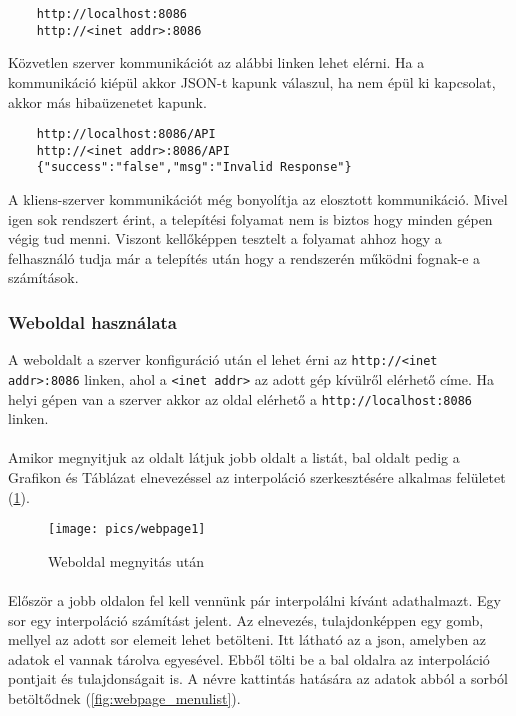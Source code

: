 	\begin{verbatim}
	http://localhost:8086
	http://<inet addr>:8086
	\end{verbatim}
	Közvetlen szerver kommunikációt az alábbi linken lehet elérni. 
	Ha a kommunikáció kiépül akkor JSON-t kapunk válaszul, ha nem épül ki kapcsolat, akkor más hibaüzenetet kapunk. 
	\begin{verbatim}
	http://localhost:8086/API
	http://<inet addr>:8086/API 
	{"success":"false","msg":"Invalid Response"}
	\end{verbatim}
	A kliens-szerver kommunikációt még bonyolítja az elosztott kommunikáció.
	Mivel igen sok rendszert érint, a telepítési folyamat nem is biztos hogy minden gépen végig tud menni. \newline
	Viszont kellőképpen tesztelt a folyamat ahhoz hogy a felhasználó tudja már a telepítés után hogy a rendszerén működni fognak-e a számítások.
\subsubsection{Weboldal használata}
	A weboldalt a szerver konfiguráció után el lehet érni az \texttt{http://<inet addr>:8086} linken, ahol a \texttt{<inet addr>} az adott gép kívülről elérhető címe. Ha helyi gépen van a szerver akkor az oldal elérhető a \texttt{http://localhost:8086} linken.

	\paragraph{}
	Amikor megnyitjuk az oldalt látjuk jobb oldalt a listát, bal oldalt pedig a Grafikon és Táblázat elnevezéssel az interpoláció szerkesztésére alkalmas felületet (\ref{fig:webpage1}).

	\begin{figure}[h]
		\texttt{[image: pics/webpage1]}
		\centering
		\caption{Weboldal megnyitás után\label{fig:webpage1}}
	\end{figure}

	\paragraph{}
	Először a jobb oldalon fel kell vennünk pár interpolálni kívánt adathalmazt. Egy sor egy interpoláció számítást jelent. Az elnevezés, tulajdonképpen egy gomb, mellyel az adott sor elemeit lehet betölteni.\newline
	Itt látható az a json, amelyben az adatok el vannak tárolva egyesével. Ebből tölti be a bal oldalra az interpoláció pontjait és tulajdonságait is. A névre kattintás hatására az adatok abból a sorból betöltődnek (\ref{fig:webpage_menulist}).

